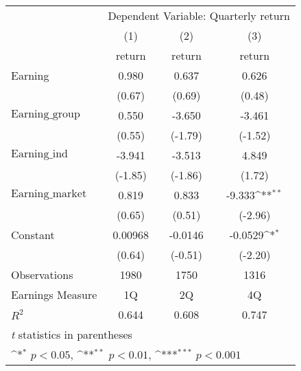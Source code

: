 {
\def\sym#1{\ifmmode^{#1}\else\(^{#1}\)\fi}
\begin{tabular}{l*{3}{c}}
\hline\hline
                    &\multicolumn{3}{c}{Dependent Variable: Quarterly return}         \\\cmidrule(lr){2-4}
                    &\multicolumn{1}{c}{(1)}&\multicolumn{1}{c}{(2)}&\multicolumn{1}{c}{(3)}\\
                    &\multicolumn{1}{c}{return}&\multicolumn{1}{c}{return}&\multicolumn{1}{c}{return}\\
\hline
Earning             &       0.980         &       0.637         &       0.626         \\
                    &      (0.67)         &      (0.69)         &      (0.48)         \\
[1em]
 $\text{Earning}\_{\text{group}} $ &       0.550         &      -3.650         &      -3.461         \\
                    &      (0.55)         &     (-1.79)         &     (-1.52)         \\
[1em]
$\text{Earning}\_{\text{ind}} $&      -3.941         &      -3.513         &       4.849         \\
                    &     (-1.85)         &     (-1.86)         &      (1.72)         \\
[1em]
$\text{Earning}\_{\text{market}} $&       0.819         &       0.833         &      -9.333\sym{**} \\
                    &      (0.65)         &      (0.51)         &     (-2.96)         \\
[1em]
Constant            &     0.00968         &     -0.0146         &     -0.0529\sym{*}  \\
                    &      (0.64)         &     (-0.51)         &     (-2.20)         \\
\hline
Observations        &        1980         &        1750         &        1316         \\
Earnings Measure    &          1Q         &          2Q         &          4Q         \\
$ R^2 $             &       0.644         &       0.608         &       0.747         \\
\hline\hline
\multicolumn{4}{l}{\footnotesize \textit{t} statistics in parentheses}\\
\multicolumn{4}{l}{\footnotesize \sym{*} \(p<0.05\), \sym{**} \(p<0.01\), \sym{***} \(p<0.001\)}\\
\end{tabular}
}
